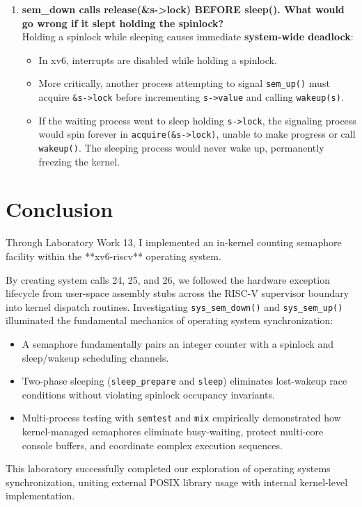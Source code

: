 \documentclass{labreport}
\begin{document}
\begin{enumerate}[leftmargin=*]
    \item \textbf{sem\_down calls release(\&s->lock) BEFORE sleep(). What would go wrong if it slept holding the spinlock?}\\[0.2em]
    Holding a spinlock while sleeping causes immediate \textbf{system-wide deadlock}:
    \begin{itemize}[noitemsep]
        \item In xv6, interrupts are disabled while holding a spinlock.
        \item More critically, another process attempting to signal \texttt{sem\_up()} must acquire \texttt{\&s->lock} before incrementing \texttt{s->value} and calling \texttt{wakeup(s)}.
        \item If the waiting process went to sleep holding \texttt{s->lock}, the signaling process would spin forever in \texttt{acquire(\&s->lock)}, unable to make progress or call \texttt{wakeup()}. The sleeping process would never wake up, permanently freezing the kernel.
    \end{itemize}
\end{enumerate}

\section{Conclusion}

Through Laboratory Work 13, I implemented an in-kernel counting semaphore facility within the **xv6-riscv** operating system.

By creating system calls 24, 25, and 26, we followed the hardware exception lifecycle from user-space assembly stubs across the RISC-V supervisor boundary into kernel dispatch routines. Investigating \texttt{sys\_sem\_down()} and \texttt{sys\_sem\_up()} illuminated the fundamental mechanics of operating system synchronization:
\begin{itemize}[noitemsep]
    \item A semaphore fundamentally pairs an integer counter with a spinlock and sleep/wakeup scheduling channels.
    \item Two-phase sleeping (\texttt{sleep\_prepare} and \texttt{sleep}) eliminates lost-wakeup race conditions without violating spinlock occupancy invariants.
    \item Multi-process testing with \texttt{semtest} and \texttt{mix} empirically demonstrated how kernel-managed semaphores eliminate busy-waiting, protect multi-core console buffers, and coordinate complex execution sequences.
\end{itemize}

This laboratory successfully completed our exploration of operating systems synchronization, uniting external POSIX library usage with internal kernel-level implementation.
\end{document}
